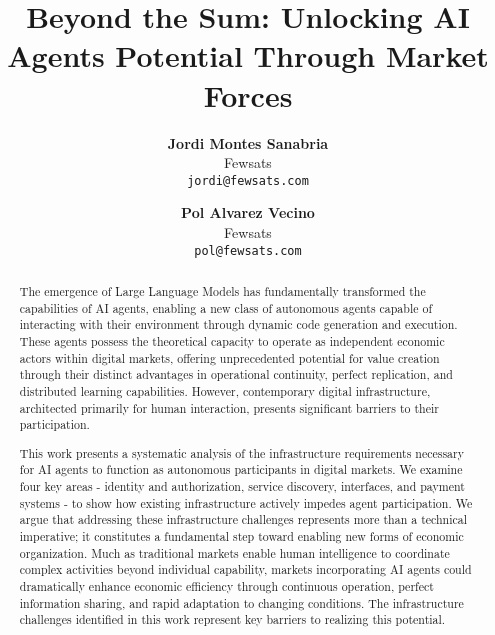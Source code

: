 \documentclass{article}
\title{Beyond the Sum: Unlocking AI Agents Potential Through Market Forces}
\author{
    \textbf{Jordi Montes Sanabria} \\
    Fewsats \\
    \texttt{jordi@fewsats.com} \and
    \textbf{Pol Alvarez Vecino} \\
    Fewsats \\
    \texttt{pol@fewsats.com}
}
\begin{document}
\maketitle





\begin{abstract}

The emergence of Large Language Models has fundamentally transformed the capabilities of AI agents, enabling a new class of autonomous agents capable of interacting with their environment through dynamic code generation and execution. These agents possess the theoretical capacity to operate as independent economic actors within digital markets, offering unprecedented potential for value creation through their distinct advantages in operational continuity, perfect replication, and distributed learning capabilities. However, contemporary digital infrastructure, architected primarily for human interaction, presents significant barriers to their participation.

This work presents a systematic analysis of the infrastructure requirements necessary for AI agents to function as autonomous participants in digital markets. We examine four key areas - identity and authorization, service discovery, interfaces, and payment systems - to show how existing infrastructure actively impedes agent participation. We argue that addressing these infrastructure challenges represents more than a technical imperative; it constitutes a fundamental step toward enabling new forms of economic organization. Much as traditional markets enable human intelligence to coordinate complex activities beyond individual capability, markets incorporating AI agents could dramatically enhance economic efficiency through continuous operation, perfect information sharing, and rapid adaptation to changing conditions. The infrastructure challenges identified in this work represent key barriers to realizing this potential.
\end{abstract}
\end{document}
